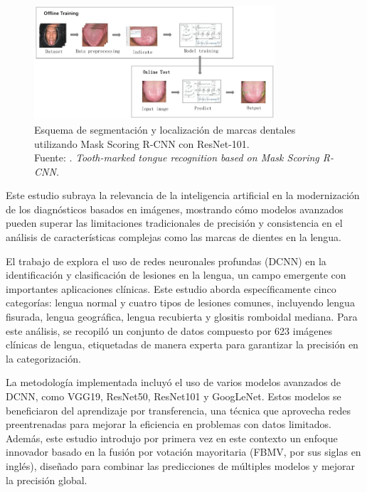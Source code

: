 \begin{figure}[H]
	\begin{center}
		\includegraphics[width=0.80\textwidth]{2/figures/7.jpeg}
		\caption[Detección de lengua marcada por dientes con Mask Scoring R-CNN]{Esquema de segmentación y localización de marcas dentales utilizando Mask Scoring R-CNN con ResNet-101. \\
		Fuente: \cite{Kong2020}. \textit{Tooth-marked tongue recognition based on Mask Scoring R-CNN.}}
		\label{2:fig129}
	\end{center}
\end{figure}

Este estudio subraya la relevancia de la inteligencia artificial en la modernización de los diagnósticos basados en imágenes, mostrando cómo modelos avanzados pueden superar las limitaciones tradicionales de precisión y consistencia en el análisis de características complejas como las marcas de dientes en la lengua.

El trabajo de \cite{Tiryaki2024} explora el uso de redes neuronales profundas (DCNN) en la identificación y clasificación de lesiones en la lengua, un campo emergente con importantes aplicaciones clínicas. Este estudio aborda específicamente cinco categorías: lengua normal y cuatro tipos de lesiones comunes, incluyendo lengua fisurada, lengua geográfica, lengua recubierta y glositis romboidal mediana. Para este análisis, se recopiló un conjunto de datos compuesto por 623 imágenes clínicas de lengua, etiquetadas de manera experta para garantizar la precisión en la categorización.

La metodología implementada incluyó el uso de varios modelos avanzados de DCNN, como VGG19, ResNet50, ResNet101 y GoogLeNet. Estos modelos se beneficiaron del aprendizaje por transferencia, una técnica que aprovecha redes preentrenadas para mejorar la eficiencia en problemas con datos limitados. Además, este estudio introdujo por primera vez en este contexto un enfoque innovador basado en la fusión por votación mayoritaria (FBMV, por sus siglas en inglés), diseñado para combinar las predicciones de múltiples modelos y mejorar la precisión global.

